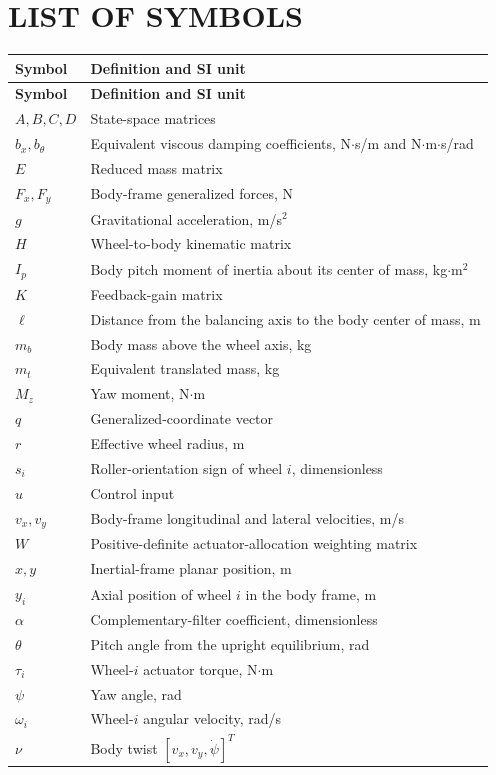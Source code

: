 \clearpage
\chapter*{LIST OF SYMBOLS}
\begin{longtable}{@{}p{1.25in}p{5.0in}@{}}
\toprule
\textbf{Symbol} & \textbf{Definition and SI unit} \\
\midrule
\endfirsthead
\toprule
\textbf{Symbol} & \textbf{Definition and SI unit} \\
\midrule
\endhead
$A,B,C,D$ & State-space matrices \\
$b_x,b_\theta$ & Equivalent viscous damping coefficients, N$\cdot$s/m and N$\cdot$m$\cdot$s/rad \\
$E$ & Reduced mass matrix \\
$F_x,F_y$ & Body-frame generalized forces, N \\
$g$ & Gravitational acceleration, m/s$^2$ \\
$H$ & Wheel-to-body kinematic matrix \\
$I_p$ & Body pitch moment of inertia about its center of mass, kg$\cdot$m$^2$ \\
$K$ & Feedback-gain matrix \\
$\ell$ & Distance from the balancing axis to the body center of mass, m \\
$m_b$ & Body mass above the wheel axis, kg \\
$m_t$ & Equivalent translated mass, kg \\
$M_z$ & Yaw moment, N$\cdot$m \\
$q$ & Generalized-coordinate vector \\
$r$ & Effective wheel radius, m \\
$s_i$ & Roller-orientation sign of wheel $i$, dimensionless \\
$u$ & Control input \\
$v_x,v_y$ & Body-frame longitudinal and lateral velocities, m/s \\
$W$ & Positive-definite actuator-allocation weighting matrix \\
$x,y$ & Inertial-frame planar position, m \\
$y_i$ & Axial position of wheel $i$ in the body frame, m \\
$\alpha$ & Complementary-filter coefficient, dimensionless \\
$\theta$ & Pitch angle from the upright equilibrium, rad \\
$\tau_i$ & Wheel-$i$ actuator torque, N$\cdot$m \\
$\psi$ & Yaw angle, rad \\
$\omega_i$ & Wheel-$i$ angular velocity, rad/s \\
$\nu$ & Body twist $[v_x,v_y,\dot{\psi}]^T$ \\
\bottomrule
\end{longtable}
